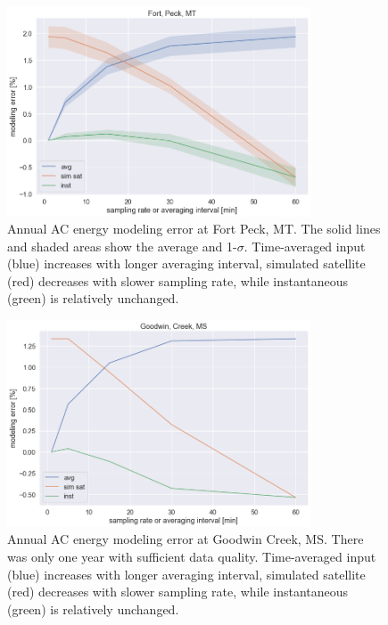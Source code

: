 \documentclass[conference]{IEEEtran}
\begin{document}
\begin{figure}[htbp]
\centerline{\includegraphics[width=9cm]{analysis/fpk_all.png}}
\caption{Annual AC energy modeling error at Fort Peck, MT. The solid lines and shaded areas show the average and 1-$\sigma$. Time-averaged input (blue) increases with longer averaging interval, simulated satellite (red) decreases with slower sampling rate, while instantaneous (green) is relatively unchanged.}
\label{fig:fpk2009}
\end{figure}

\begin{figure}[htbp]
\centerline{\includegraphics[width=9cm]{analysis/gwn_all.png}}
\caption{Annual AC energy modeling error at Goodwin Creek, MS. There was only one year with sufficient data quality. Time-averaged input (blue) increases with longer averaging interval, simulated satellite (red) decreases with slower sampling rate, while instantaneous (green) is relatively unchanged.}
\label{fig:gwn2012}
\end{figure}
\end{document}
